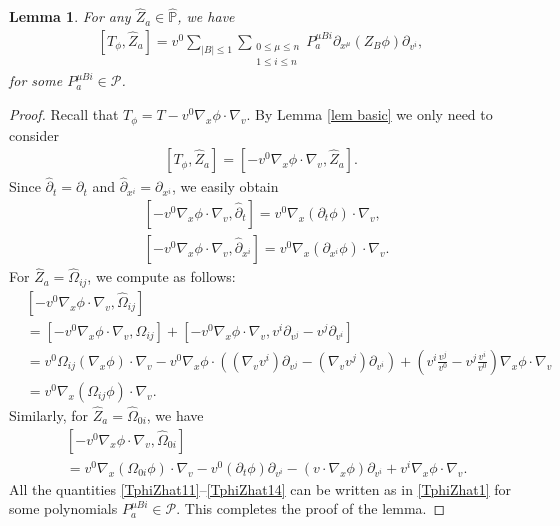 \documentclass{article}
\newtheorem{lemma}{Lemma}[section]
\newcommand{\bbp}{{\mathbb P}}
\newcommand{\cP}{{\mathcal P}}
\begin{document}
%
\begin{lemma} \label{lem TphiZhat1}
For any $ \hat{ Z }_a \in \hat{ \bbp } $, we have
\begin{align}
\left[ T_\phi , \hat{ Z }_a \right] = v^0 \sum_{ | B | \leq 1 } \sum_{ \substack{ 0 \leq \mu \leq n \\ 1 \leq i \leq n } } P^{ \mu B i }_{ a } \partial_{ x^\mu } ( Z_B \phi ) \partial_{ v^i } , \label{TphiZhat1}
\end{align}
for some $ P^{ \mu B i }_{ a } \in \cP $. 
\end{lemma}
\begin{proof}
Recall that $ T_\phi = T - v^0 \nabla_x \phi \cdot \nabla_v $. By Lemma \ref{lem basic} we only need to consider
\begin{align*}
\left[ T_\phi , \hat{ Z }_a \right] = \left[ - v^0 \nabla_x \phi \cdot \nabla_v , \hat{ Z }_a \right] .
\end{align*}
Since $ \hat{ \partial }_t = \partial_t $ and $ \hat{ \partial }_{ x^i } = \partial_{ x^i } $, we easily obtain
\begin{align}
& \left[ - v^0 \nabla_x \phi \cdot \nabla_v , \hat{ \partial }_t \right] = v^0 \nabla_x ( \partial_t \phi ) \cdot \nabla_v , \label{TphiZhat11} \\
& \left[ - v^0 \nabla_x \phi \cdot \nabla_v , \hat{ \partial }_{ x^i } \right] = v^0 \nabla_x ( \partial_{ x^i } \phi ) \cdot \nabla_v . \label{TphiZhat12}
\end{align}
For $ \hat{ Z }_a = \hat{ \Omega }_{ i j } $, we compute as follows:
\begin{align}
& \left[ - v^0 \nabla_x \phi \cdot \nabla_v , \hat{ \Omega }_{ i j } \right] \nonumber \\
& = \left[ - v^0 \nabla_x \phi \cdot \nabla_v , \Omega_{ i j } \right] + \left[ - v^0 \nabla_x \phi \cdot \nabla_v , v^i \partial_{ v^j } - v^j \partial_{ v^i } \right] \nonumber \\
& = v^0 \Omega_{ i j } ( \nabla_x \phi ) \cdot \nabla_v - v^0 \nabla_x \phi \cdot \left( ( \nabla_v v^i ) \partial_{ v^j } - ( \nabla_v v^j ) \partial_{ v^i } \right) + \left( v^i \frac{ v^j }{ v^0 } - v^j \frac{ v^i }{ v^0 } \right) \nabla_x \phi \cdot \nabla_v \nonumber \\
& = v^0 \nabla_x ( \Omega_{ i j } \phi ) \cdot \nabla_v . \label{TphiZhat13}
\end{align}
Similarly, for $ \hat{ Z }_a = \hat{ \Omega }_{ 0 i } $, we have
\begin{align}
& \left[ - v^0 \nabla_x \phi \cdot \nabla_v , \hat{ \Omega }_{ 0 i } \right] \nonumber \\
& = v^0 \nabla_x ( \Omega_{ 0 i } \phi ) \cdot \nabla_v - v^0 ( \partial_t \phi ) \partial_{ v^i } - ( v \cdot \nabla_x \phi ) \partial_{ v^i } + v^i \nabla_x \phi \cdot \nabla_v . \label{TphiZhat14}
\end{align}
All the quantities \eqref{TphiZhat11}--\eqref{TphiZhat14} can be written as in \eqref{TphiZhat1} for some polynomials $ P^{ \mu B i }_{ a } \in \cP $. This completes the proof of the lemma.
\end{proof}
\end{document}
